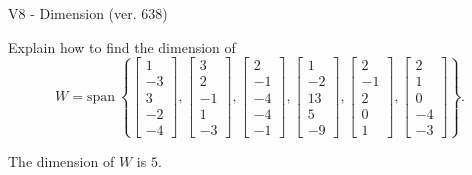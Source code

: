 \begin{exercise}
  \begin{exerciseTitle}V8 - Dimension (ver. 638)\end{exerciseTitle}
  \begin{exerciseStatement}
    Explain how to find the dimension of 
\[W=\mathrm{span}\ \left\{\left[\begin{array}{r}
1 \\
-3 \\
3 \\
-2 \\
-4
\end{array}\right] , \left[\begin{array}{r}
3 \\
2 \\
-1 \\
1 \\
-3
\end{array}\right] , \left[\begin{array}{r}
2 \\
-1 \\
-4 \\
-4 \\
-1
\end{array}\right] , \left[\begin{array}{r}
1 \\
-2 \\
13 \\
5 \\
-9
\end{array}\right] , \left[\begin{array}{r}
2 \\
-1 \\
2 \\
0 \\
1
\end{array}\right] , \left[\begin{array}{r}
2 \\
1 \\
0 \\
-4 \\
-3
\end{array}\right]\right\}.\]



  \end{exerciseStatement}
  \begin{exerciseAnswer}
   The dimension of \(W\) is  \(5\).
  


  \end{exerciseAnswer}
\end{exercise}